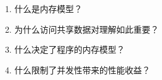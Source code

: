 \begin{enumerate}
\item 什么是内存模型？
\item 为什么访问共享数据对理解如此重要？
\item 什么决定了程序的内存模型？
\item 什么限制了并发性带来的性能收益？
\end{enumerate}